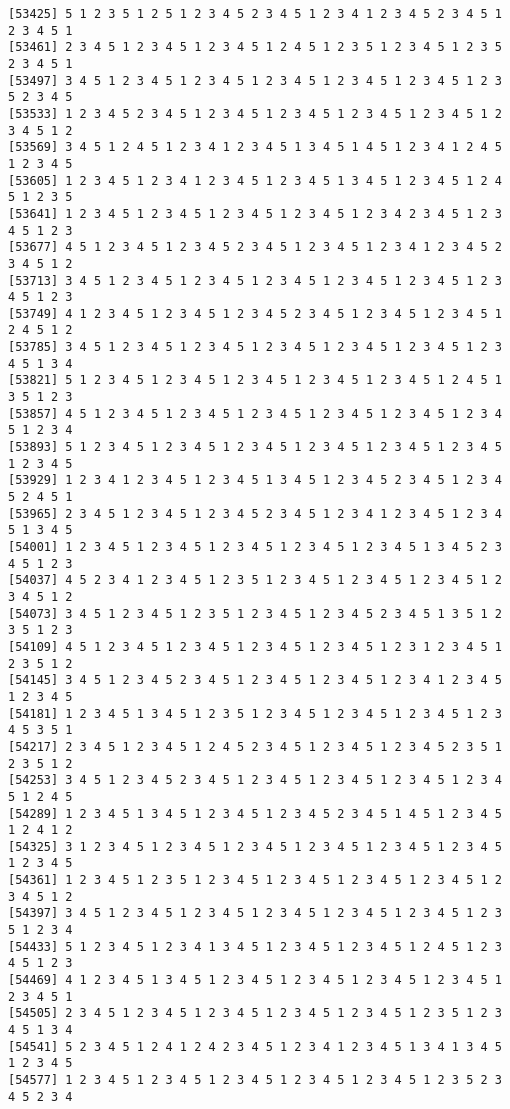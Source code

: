 \documentclass[
  11pt,
]{book}
\begin{document}
\begin{verbatim}
[53425] 5 1 2 3 5 1 2 5 1 2 3 4 5 2 3 4 5 1 2 3 4 1 2 3 4 5 2 3 4 5 1 2 3 4 5 1
[53461] 2 3 4 5 1 2 3 4 5 1 2 3 4 5 1 2 4 5 1 2 3 5 1 2 3 4 5 1 2 3 5 2 3 4 5 1
[53497] 3 4 5 1 2 3 4 5 1 2 3 4 5 1 2 3 4 5 1 2 3 4 5 1 2 3 4 5 1 2 3 5 2 3 4 5
[53533] 1 2 3 4 5 2 3 4 5 1 2 3 4 5 1 2 3 4 5 1 2 3 4 5 1 2 3 4 5 1 2 3 4 5 1 2
[53569] 3 4 5 1 2 4 5 1 2 3 4 1 2 3 4 5 1 3 4 5 1 4 5 1 2 3 4 1 2 4 5 1 2 3 4 5
[53605] 1 2 3 4 5 1 2 3 4 1 2 3 4 5 1 2 3 4 5 1 3 4 5 1 2 3 4 5 1 2 4 5 1 2 3 5
[53641] 1 2 3 4 5 1 2 3 4 5 1 2 3 4 5 1 2 3 4 5 1 2 3 4 2 3 4 5 1 2 3 4 5 1 2 3
[53677] 4 5 1 2 3 4 5 1 2 3 4 5 2 3 4 5 1 2 3 4 5 1 2 3 4 1 2 3 4 5 2 3 4 5 1 2
[53713] 3 4 5 1 2 3 4 5 1 2 3 4 5 1 2 3 4 5 1 2 3 4 5 1 2 3 4 5 1 2 3 4 5 1 2 3
[53749] 4 1 2 3 4 5 1 2 3 4 5 1 2 3 4 5 2 3 4 5 1 2 3 4 5 1 2 3 4 5 1 2 4 5 1 2
[53785] 3 4 5 1 2 3 4 5 1 2 3 4 5 1 2 3 4 5 1 2 3 4 5 1 2 3 4 5 1 2 3 4 5 1 3 4
[53821] 5 1 2 3 4 5 1 2 3 4 5 1 2 3 4 5 1 2 3 4 5 1 2 3 4 5 1 2 4 5 1 3 5 1 2 3
[53857] 4 5 1 2 3 4 5 1 2 3 4 5 1 2 3 4 5 1 2 3 4 5 1 2 3 4 5 1 2 3 4 5 1 2 3 4
[53893] 5 1 2 3 4 5 1 2 3 4 5 1 2 3 4 5 1 2 3 4 5 1 2 3 4 5 1 2 3 4 5 1 2 3 4 5
[53929] 1 2 3 4 1 2 3 4 5 1 2 3 4 5 1 3 4 5 1 2 3 4 5 2 3 4 5 1 2 3 4 5 2 4 5 1
[53965] 2 3 4 5 1 2 3 4 5 1 2 3 4 5 2 3 4 5 1 2 3 4 1 2 3 4 5 1 2 3 4 5 1 3 4 5
[54001] 1 2 3 4 5 1 2 3 4 5 1 2 3 4 5 1 2 3 4 5 1 2 3 4 5 1 3 4 5 2 3 4 5 1 2 3
[54037] 4 5 2 3 4 1 2 3 4 5 1 2 3 5 1 2 3 4 5 1 2 3 4 5 1 2 3 4 5 1 2 3 4 5 1 2
[54073] 3 4 5 1 2 3 4 5 1 2 3 5 1 2 3 4 5 1 2 3 4 5 2 3 4 5 1 3 5 1 2 3 5 1 2 3
[54109] 4 5 1 2 3 4 5 1 2 3 4 5 1 2 3 4 5 1 2 3 4 5 1 2 3 1 2 3 4 5 1 2 3 5 1 2
[54145] 3 4 5 1 2 3 4 5 2 3 4 5 1 2 3 4 5 1 2 3 4 5 1 2 3 4 1 2 3 4 5 1 2 3 4 5
[54181] 1 2 3 4 5 1 3 4 5 1 2 3 5 1 2 3 4 5 1 2 3 4 5 1 2 3 4 5 1 2 3 4 5 3 5 1
[54217] 2 3 4 5 1 2 3 4 5 1 2 4 5 2 3 4 5 1 2 3 4 5 1 2 3 4 5 2 3 5 1 2 3 5 1 2
[54253] 3 4 5 1 2 3 4 5 2 3 4 5 1 2 3 4 5 1 2 3 4 5 1 2 3 4 5 1 2 3 4 5 1 2 4 5
[54289] 1 2 3 4 5 1 3 4 5 1 2 3 4 5 1 2 3 4 5 2 3 4 5 1 4 5 1 2 3 4 5 1 2 4 1 2
[54325] 3 1 2 3 4 5 1 2 3 4 5 1 2 3 4 5 1 2 3 4 5 1 2 3 4 5 1 2 3 4 5 1 2 3 4 5
[54361] 1 2 3 4 5 1 2 3 5 1 2 3 4 5 1 2 3 4 5 1 2 3 4 5 1 2 3 4 5 1 2 3 4 5 1 2
[54397] 3 4 5 1 2 3 4 5 1 2 3 4 5 1 2 3 4 5 1 2 3 4 5 1 2 3 4 5 1 2 3 5 1 2 3 4
[54433] 5 1 2 3 4 5 1 2 3 4 1 3 4 5 1 2 3 4 5 1 2 3 4 5 1 2 4 5 1 2 3 4 5 1 2 3
[54469] 4 1 2 3 4 5 1 3 4 5 1 2 3 4 5 1 2 3 4 5 1 2 3 4 5 1 2 3 4 5 1 2 3 4 5 1
[54505] 2 3 4 5 1 2 3 4 5 1 2 3 4 5 1 2 3 4 5 1 2 3 4 5 1 2 3 5 1 2 3 4 5 1 3 4
[54541] 5 2 3 4 5 1 2 4 1 2 4 2 3 4 5 1 2 3 4 1 2 3 4 5 1 3 4 1 3 4 5 1 2 3 4 5
[54577] 1 2 3 4 5 1 2 3 4 5 1 2 3 4 5 1 2 3 4 5 1 2 3 4 5 1 2 3 5 2 3 4 5 2 3 4

\end{verbatim}
\end{document}

